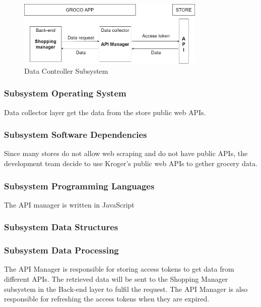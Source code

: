 \begin{figure}[h!]
	\centering
 	\includegraphics[width=0.80\textwidth]{images/dataCollectorFlowChart.jpg}
 \caption{Data Controller Subsystem}
\end{figure}

\subsubsection{Subsystem Operating System}
Data collector layer get the data from the store public web APIs.

\subsubsection{Subsystem Software Dependencies}
Since many stores do not allow web scraping and do not have public APIs, the development team decide to use Kroger's public web APIs to gether grocery data. 

\subsubsection{Subsystem Programming Languages}
The API manager is written in JavaScript

\subsubsection{Subsystem Data Structures}

\subsubsection{Subsystem Data Processing}
The API Manager is responsible for storing access tokens to get data from different APIs. The retrieved data will be sent to the Shopping Manager subsystem in the Back-end layer to fulfil the request. The API Manager is also responsible for refreshing the access tokens when they are expired.

